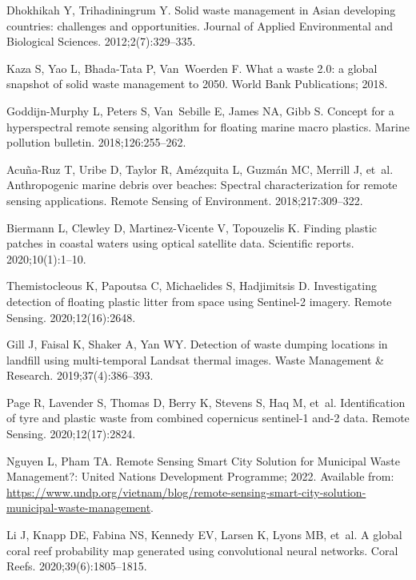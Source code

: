 \documentclass[10pt,letterpaper]{article}
\begin{document}
\begin{thebibliography}{10}
Dhokhikah Y, Trihadiningrum Y.
\newblock Solid waste management in Asian developing countries: challenges and
  opportunities.
\newblock Journal of Applied Environmental and Biological Sciences.
  2012;2(7):329--335.

Kaza S, Yao L, Bhada-Tata P, Van~Woerden F.
\newblock What a waste 2.0: a global snapshot of solid waste management to
  2050.
\newblock World Bank Publications; 2018.

Goddijn-Murphy L, Peters S, Van~Sebille E, James NA, Gibb S.
\newblock Concept for a hyperspectral remote sensing algorithm for floating
  marine macro plastics.
\newblock Marine pollution bulletin. 2018;126:255--262.

Acu{\~n}a-Ruz T, Uribe D, Taylor R, Am{\'e}zquita L, Guzm{\'a}n MC, Merrill J,
  et~al.
\newblock Anthropogenic marine debris over beaches: Spectral characterization
  for remote sensing applications.
\newblock Remote Sensing of Environment. 2018;217:309--322.

Biermann L, Clewley D, Martinez-Vicente V, Topouzelis K.
\newblock Finding plastic patches in coastal waters using optical satellite
  data.
\newblock Scientific reports. 2020;10(1):1--10.

Themistocleous K, Papoutsa C, Michaelides S, Hadjimitsis D.
\newblock Investigating detection of floating plastic litter from space using
  Sentinel-2 imagery.
\newblock Remote Sensing. 2020;12(16):2648.

Gill J, Faisal K, Shaker A, Yan WY.
\newblock Detection of waste dumping locations in landfill using multi-temporal
  Landsat thermal images.
\newblock Waste Management \& Research. 2019;37(4):386--393.

Page R, Lavender S, Thomas D, Berry K, Stevens S, Haq M, et~al.
\newblock Identification of tyre and plastic waste from combined copernicus
  sentinel-1 and-2 data.
\newblock Remote Sensing. 2020;12(17):2824.

Nguyen L, Pham TA. Remote Sensing Smart City Solution for Municipal Waste
  Management?: United Nations Development Programme; 2022.
\newblock Available from:
  \url{https://www.undp.org/vietnam/blog/remote-sensing-smart-city-solution-municipal-waste-management}.

Li J, Knapp DE, Fabina NS, Kennedy EV, Larsen K, Lyons MB, et~al.
\newblock A global coral reef probability map generated using convolutional
  neural networks.
\newblock Coral Reefs. 2020;39(6):1805--1815.


\end{thebibliography}
\end{document}
